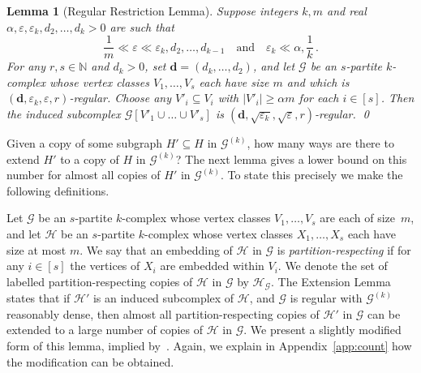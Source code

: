 \documentclass[12pt,a4paper]{amsart}
\let\eps\varepsilon
\newtheorem{lemma}[theorem] {Lemma}
\newcommand{\NATS}{\mathbb{N}}
\newcommand{\Hy}{\mathcal{H}}
\newcommand{\cG}{\mathcal{G}}
\begin{document}
\begin{lemma}[Regular Restriction Lemma]\label{restriction} 
Suppose integers $k,m$ and real $\alpha,\eps,\eps_k,d_2,\ldots,d_k > 0$ are such that
$$\frac{1}{m}\ll \eps\ll \eps_k,d_2,\dots,d_{k-1}\quad\text{and}\quad  \eps_k\ll \alpha,\frac{1}{k}\,.$$ 
For any $r,s\in\NATS$ and $d_k>0$, set $\mathbf{d} = (d_k, \dots, d_2)$, and let $\cG$ be an $s$-partite $k$-complex whose vertex classes $V_1, \dots, V_s$ each have size $m$ and which is $(\mathbf{d}, \eps_k, \eps, r)$-regular. Choose any $V'_i \subseteq V_i$ with $|V'_i| \geq \alpha m$ for each $i \in [s]$. Then the induced subcomplex $\cG[V'_1 \cup \dots \cup V'_s]$ is $(\mathbf{d},\sqrt{\eps_k},\sqrt{\eps},r)$-regular. \qed
\end{lemma}

Given a copy of some subgraph $H' \subseteq H$ in $\cG^{(k)}$, how many ways are there to extend $H'$ to a copy of $H$ in $\cG^{(k)}$? The next lemma gives a lower bound on this number for almost all copies of $H'$ in $\cG^{(k)}$. To state this precisely we make the following definitions. 

Let $\cG$ be an $s$-partite $k$-complex whose vertex classes $V_1, \dots ,V_s$
are each of size~$m$, and let $\Hy$ be an $s$-partite $k$-complex whose vertex
classes $X_1, \dots, X_s$ each have size at most $m$. We say that an embedding of $\Hy$ in $\cG$ is
\emph{partition-respecting} if for any $i \in [s]$ the vertices of $X_i$ are
embedded within $V_i$. We denote the set of labelled partition-respecting copies
of $\Hy$ in $\cG$ by $\Hy_\cG$. The Extension Lemma~\cite[Lemma 5]{CFKO}
states that if $\Hy'$ is an induced subcomplex of $\Hy$, and $\cG$ is regular with $\cG^{(k)}$ reasonably dense, then almost all partition-respecting copies of
$\Hy'$ in $\cG$ can be extended to a large number of copies of $\Hy$ in
$\cG$. We present a slightly modified form of this lemma,  implied
by~\cite[Lemma~4.6]{lcycles}.
Again, we explain in Appendix~\ref{app:count} how the modification can be obtained.
\end{document}
